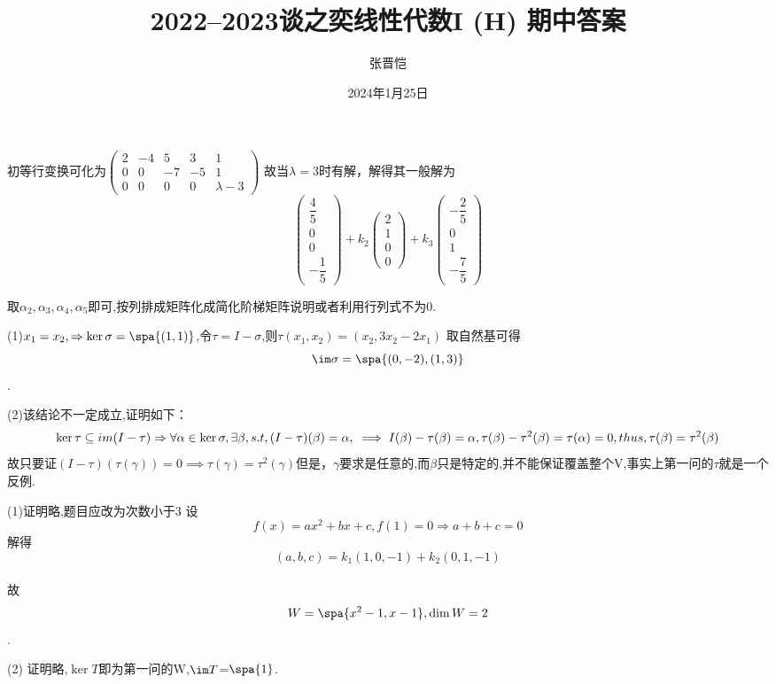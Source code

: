 \documentclass[UTF8]{article}
\title{2022--2023谈之奕线性代数I (H) 期中答案 }
\author{张晋恺}
\date{2024年1月25日}
\begin{document}
\maketitle
{}
初等行变换可化为$ \left(\begin{matrix}  2&-4&5&3&1\\0&0&-7&-5&1\\0&0&0&0&\lambda-3 \end{matrix}\right)$
故当$\lambda=3$时有解，解得其一般解为\\
$$\left(\begin{matrix} \dfrac{4}{5}\\0\\0\\-\dfrac{1}{5}\end{matrix}\right)+k_2\left(\begin{matrix} 2\\1\\0\\0\end{matrix}\right)
+k_3\left(\begin{matrix} -\dfrac{2}{5}\\0\\1\\-\dfrac{7}{5}\end{matrix}\right)$$
\par
{}
取$\alpha_2,\alpha_3,\alpha_4,\alpha_5$即可,按列排成矩阵化成简化阶梯矩阵说明或者利用行列式不为0.\par
{}
(1)$x_1=x_2,\Rightarrow \ker\sigma=\spa\{ ( 1,1 )\}$,令$\tau=I-\sigma$,则$\tau ( x_1,x_2 )= (x_2,3x_2-2x_1 )$
取自然基可得
$$\im \sigma= \spa \{(0,-2),(1,3)\}$$.\par
(2)该结论不一定成立,证明如下：
$$
\ker\tau\subseteq im(I-\tau)\Rightarrow\forall\alpha\in \ker\sigma,\exists\beta,s.t,(I-\tau)(\beta)=\alpha,\\
\implies I(\beta)-\tau(\beta)=\alpha,\tau(\beta)-\tau^2(\beta)=\tau(\alpha)=0,thus,\tau(\beta)=\tau^2(\beta)
$$
故只要证$(I-\tau)(\tau(\gamma))=0\implies\tau(\gamma)=\tau^2(\gamma)$但是，$\gamma$要求是任意的,而$\beta$只是特定的,并不能保证覆盖整个V,事实上第一问的$\tau$就是一个反例.
\par
{}
(1)证明略,题目应改为次数小于3
设$$f(x)=ax^2+bx+c,f(1)=0\Rightarrow a+b+c=0$$解得$$(a,b,c)=k_1(1,0,-1)+k_2(0,1,-1)$$\\
故$$W=\spa \{x^2-1,x-1\},\dim W=2$$.\par
(2)
证明略,$\ker T$即为第一问的W,$\im T$=$\spa\{1\}$.
\par
\end{document}

